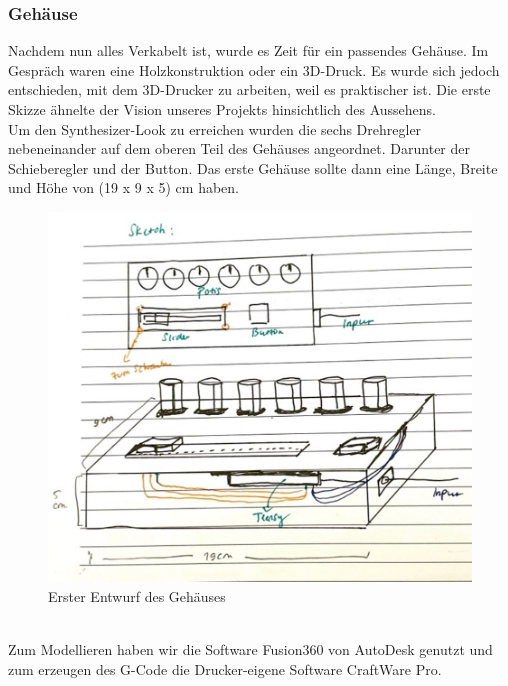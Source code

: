 \documentclass[12pt]{scrartcl}%
\theoremstyle{nonumberplain}
\begin{document}
\newpage

\subsubsection{Gehäuse}

\noindent Nachdem nun alles Verkabelt ist, wurde es Zeit für ein passendes Gehäuse. Im Gespräch waren eine Holzkonstruktion oder ein 3D-Druck. Es wurde sich jedoch entschieden, mit dem 3D-Drucker zu arbeiten, weil es praktischer ist. Die erste Skizze ähnelte der Vision unseres Projekts hinsichtlich des Aussehens.\\
Um den Synthesizer-Look zu erreichen wurden die sechs Drehregler  nebeneinander auf dem oberen Teil des Gehäuses angeordnet. Darunter der Schieberegler und der Button. Das erste Gehäuse sollte dann eine Länge, Breite und Höhe von (19 x 9 x 5) cm haben.\\
\begin{figure}[h]
\centering
  \includegraphics[scale=0.3]{hw_1}
  \caption{Erster Entwurf des Gehäuses}
\end{figure}\\
Zum Modellieren haben wir die Software Fusion360 von AutoDesk genutzt und zum erzeugen des G-Code die Drucker-eigene Software CraftWare Pro.\\
\end{document}
